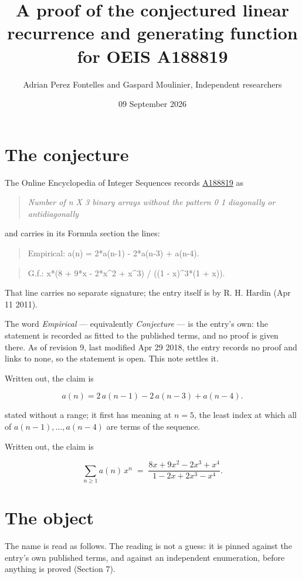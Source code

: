 \documentclass[11pt]{article}
\title{A proof of the conjectured linear recurrence and generating function for OEIS A188819}
\author{Adrian Perez Fontelles and Gaspard Moulinier, Independent researchers}
\date{09 September 2026}
\theoremstyle{definition}
\begin{document}
\maketitle
\section{The conjecture}

The Online Encyclopedia of Integer Sequences records \href{https://oeis.org/A188819}{A188819} as

\begin{quote}\itshape Number of n X 3 binary arrays without the pattern 0 1 diagonally or antidiagonally\end{quote}

and carries in its Formula section the lines:

\begin{quote}\ttfamily Empirical: a(n) = 2*a(n-1) - 2*a(n-3) + a(n-4).\end{quote}

\begin{quote}\ttfamily G.f.: x*(8 + 9*x - 2*x\textasciicircum{}2 + x\textasciicircum{}3) / ((1 - x)\textasciicircum{}3*(1 + x)).\end{quote}

That line carries no separate signature; the entry itself is by R. H. Hardin (Apr 11 2011).

The word {\itshape Empirical} --- equivalently {\itshape Conjecture} --- is the entry's own: the statement is recorded as fitted to the published terms, and no proof is given there. As of revision 9, last modified Apr 29 2018, the entry records no proof and links to none, so the statement is open. This note settles it.

Written out, the claim is

\[a(n) = 2\,a(n-1) - 2\,a(n-3) + a(n-4).\]

stated without a range; it first has meaning at $n = 5$, the least index at which all of $a(n-1),\dots,a(n-4)$ are terms of the sequence.

Written out, the claim is

\[\sum_{n \ge 1} a(n)\,x^n \;=\; \frac{8x + 9x^{2} - 2x^{3} + x^{4}}{1 - 2x + 2x^{3} - x^{4}}.\]

\section{The object}

The name is read as follows. The reading is not a guess: it is pinned against the entry's own published terms, and against an independent enumeration, before anything is proved (Section 7).
\end{document}
